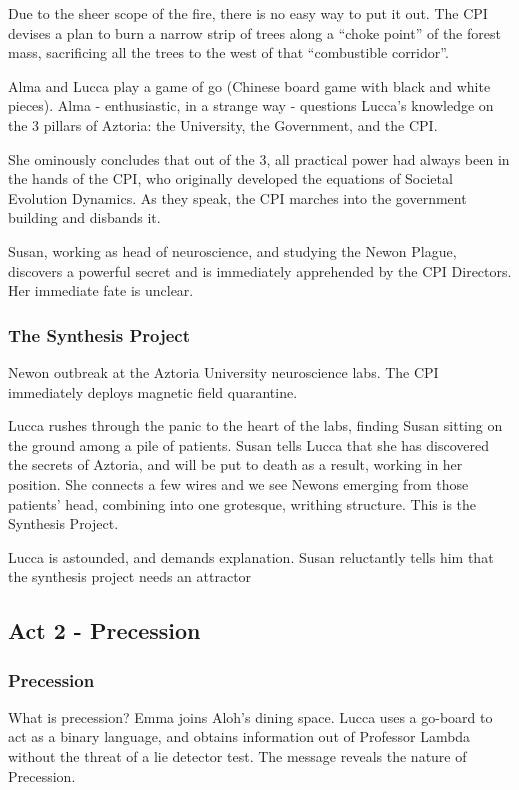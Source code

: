 \documentclass[11pt]{article}
\begin{document}
		Due to the sheer scope of the fire, there is no easy way to put it out. 
		The CPI devises a plan to burn a narrow strip of trees along a “choke point” of the forest mass, sacrificing all the trees to the west of that “combustible corridor”. 
		
		Alma and Lucca play a game of go (Chinese board game with black and white pieces). Alma - enthusiastic, in a strange way - questions Lucca's knowledge on the 3 pillars of Aztoria: the University, the Government, and the CPI.
		
		She ominously concludes that out of the 3, all practical power had always been in the hands of the CPI, who originally developed the equations of Societal Evolution Dynamics.
		As they speak, the CPI marches into the government building and disbands it. 
		
		Susan, working as head of neuroscience, and studying the Newon Plague, discovers a powerful secret and is immediately apprehended by the CPI Directors. Her immediate fate is unclear.
		
		\subsubsection{The Synthesis Project}
		Newon outbreak at the Aztoria University neuroscience labs.
		The CPI immediately deploys magnetic field quarantine. 
		
		Lucca rushes through the panic to the heart of the labs, finding Susan sitting on the ground among a pile of patients.
		Susan tells Lucca that she has discovered the secrets of Aztoria, and will be put to death as a result, working in her position. 
		She connects a few wires and we see Newons emerging from those patients' head, combining into one grotesque, writhing structure. 
		This is the Synthesis Project. 
		
		Lucca is astounded, and demands explanation. Susan reluctantly tells him that the synthesis project needs an attractor
	\newpage



	\subsection{Act 2 - Precession}
		\subsubsection{Precession}
		What is precession? 
		Emma joins Aloh's dining space.
		Lucca uses a go-board to act as a binary language, and obtains information out of Professor Lambda without the threat of a lie detector test.
		The message reveals the nature of Precession.
\end{document}
